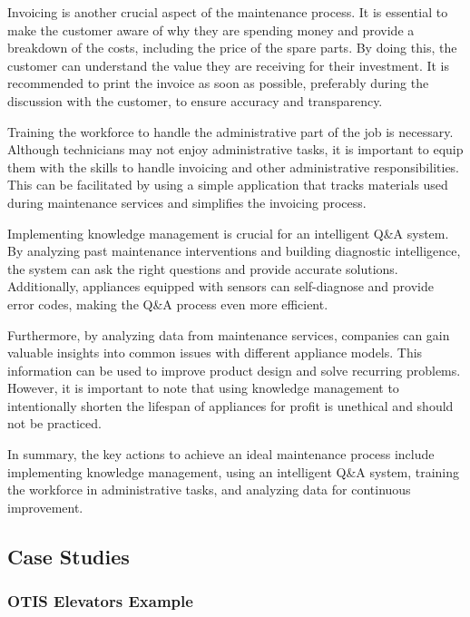 Invoicing is another crucial aspect of the maintenance process. It is
essential to make the customer aware of why they are spending money and
provide a breakdown of the costs, including the price of the spare
parts. By doing this, the customer can understand the value they are
receiving for their investment. It is recommended to print the invoice
as soon as possible, preferably during the discussion with the customer,
to ensure accuracy and transparency.

Training the workforce to handle the administrative part of the job is
necessary. Although technicians may not enjoy administrative tasks, it
is important to equip them with the skills to handle invoicing and other
administrative responsibilities. This can be facilitated by using a
simple application that tracks materials used during maintenance
services and simplifies the invoicing process.


Implementing knowledge management is crucial for an intelligent Q\&A
system. By analyzing past maintenance interventions and building
diagnostic intelligence, the system can ask the right questions and
provide accurate solutions. Additionally, appliances equipped with
sensors can self-diagnose and provide error codes, making the Q\&A
process even more efficient.

Furthermore, by analyzing data from maintenance services, companies can
gain valuable insights into common issues with different appliance
models. This information can be used to improve product design and solve
recurring problems. However, it is important to note that using
knowledge management to intentionally shorten the lifespan of appliances
for profit is unethical and should not be practiced.

In summary, the key actions to achieve an ideal maintenance process
include implementing knowledge management, using an intelligent Q\&A
system, training the workforce in administrative tasks, and analyzing
data for continuous improvement.

\subsection{Case Studies}\label{case-studies}

\subsubsection{OTIS Elevators Example}\label{otis-elevators-example}

